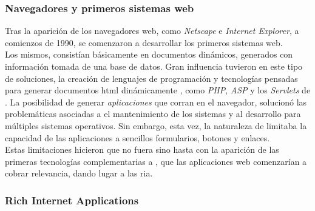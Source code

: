 \subsubsection{Navegadores y primeros sistemas web}
\label{subsubsec:intro:about_web:web}

Tras la aparición de los navegadores web, como \emph{Netscape} e \emph{Internet Explorer},
a comienzos de 1990, se comenzaron a desarrollar los primeros sistemas web.\\
Los mismos, consistían básicamente en documentos dinámicos, generados con información
tomada de una base de datos. Gran influencia tuvieron en este tipo de soluciones, la
creación de lenguajes de programación y tecnologías pensadas para generar documentos
\gls{html} dinámicamente , como \emph{PHP}, \emph{ASP}
y los \emph{Servlets} de \java.
La posibilidad de generar \emph{aplicaciones} que corran en el navegador, solucionó las
problemáticas asociadas a el mantenimiento de los sistemas y al desarrollo para múltiples
sistemas operativos. Sin embargo, esta vez, la naturaleza de \html limitaba la capacidad
de las aplicaciones a sencillos formularios, botones y enlaces.\\
Estas limitaciones hicieron que no fuera sino hasta con la aparición de las primeras
tecnologías complementarias a \html, que las aplicaciones web comenzarían a cobrar
relevancia, dando lugar a las \ac{ria}.

\subsubsection{Rich Internet Applications}
\label{subsubsec:intro:about_web:rias}

